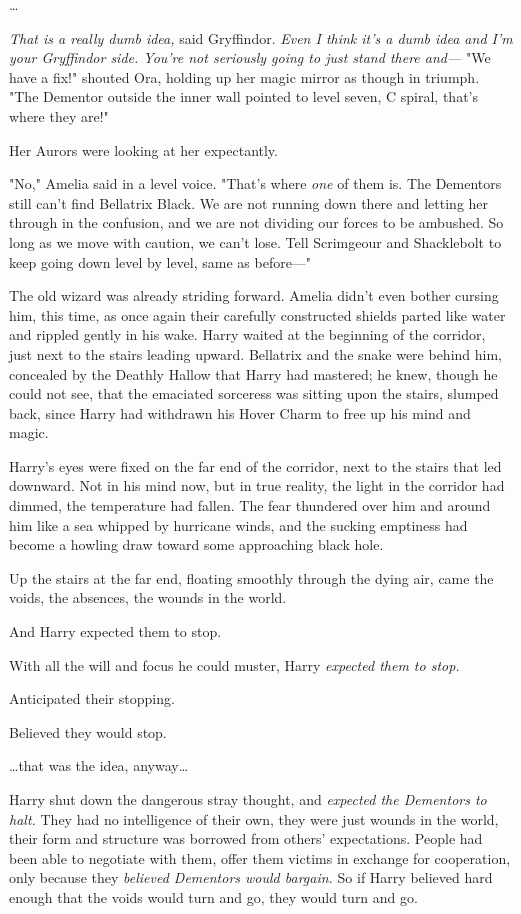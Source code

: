 …

\emph{That is a really dumb idea,} said Gryffindor. \emph{Even I think it's a
dumb idea and I'm your Gryffindor side. You're not seriously going to just
stand there and---}
\later
"We have a fix!" shouted Ora, holding up her magic mirror as though in triumph.
"The Dementor outside the inner wall pointed to level seven, C spiral, that's
where they are!"

Her Aurors were looking at her expectantly.

"No," Amelia said in a level voice. "That's where \emph{one} of them is. The
Dementors still can't find Bellatrix Black. We are not running down there and
letting her through in the confusion, and we are not dividing our forces to be
ambushed. So long as we move with caution, we can't lose. Tell Scrimgeour and
Shacklebolt to keep going down level by level, same as before---"

The old wizard was already striding forward. Amelia didn't even bother cursing
him, this time, as once again their carefully constructed shields parted like
water and rippled gently in his wake.
\later
Harry waited at the beginning of the corridor, just next to the stairs leading
upward. Bellatrix and the snake were behind him, concealed by the Deathly
Hallow that Harry had mastered; he knew, though he could not see, that the
emaciated sorceress was sitting upon the stairs, slumped back, since Harry had
withdrawn his Hover Charm to free up his mind and magic.

Harry's eyes were fixed on the far end of the corridor, next to the stairs that
led downward. Not in his mind now, but in true reality, the light in the
corridor had dimmed, the temperature had fallen. The fear thundered over him
and around him like a sea whipped by hurricane winds, and the sucking emptiness
had become a howling draw toward some approaching black hole.

Up the stairs at the far end, floating smoothly through the dying air, came the
voids, the absences, the wounds in the world.

And Harry expected them to stop.

With all the will and focus he could muster, Harry \emph{expected them to stop.}

Anticipated their stopping.

Believed they would stop.

…that was the idea, anyway…

Harry shut down the dangerous stray thought, and \emph{expected the Dementors
to halt.} They had no intelligence of their own, they were just wounds in the
world, their form and structure was borrowed from others' expectations. People
had been able to negotiate with them, offer them victims in exchange for
cooperation, only because they \emph{believed Dementors would bargain.} So if
Harry believed hard enough that the voids would turn and go, they would turn
and go.

